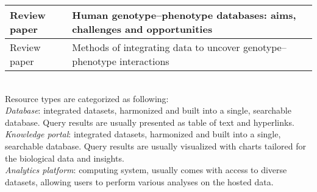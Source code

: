 \documentclass[12pt,letter]{article}
\begin{document}
\begin{landscape}
\begin{table}[]
\begin{tabular}{lp{8cm}ll}
			Review paper       & \multicolumn{2}{l}{Human genotype–phenotype databases: aims, challenges and opportunities} & \cite{Brookes:2015:Human}             \\ \hline
			Review paper       & \multicolumn{2}{l}{Methods of integrating data to uncover genotype–phenotype interactions} & \cite{Ritchie:2015:Methods}           \\ \hline
		\end{tabular}	\\ \newline
	\footnotesize{Resource types are categorized as following:\\
\textit{Database}: integrated datasets, harmonized and built into a single, searchable database. Query results are usually presented as table of text and hyperlinks.
\\
\textit{Knowledge portal}: integrated datasets, harmonized and built into a single, searchable database. Query results are usually visualized with charts tailored for the biological data and insights.
\\
\textit{Analytics platform}: computing system, usually comes with access to diverse datasets, allowing users to perform various analyses on the hosted data.	
}
	\end{table}
\end{landscape}



\end{document}
